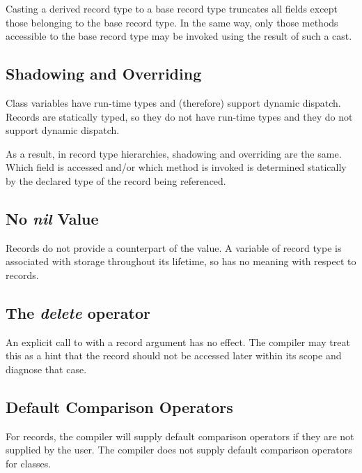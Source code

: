 Casting a derived record type to a base record type truncates all 
fields except those belonging to the base record type.  In the same way, only
those methods accessible to the base record type may be invoked using the result
of such a cast.

\subsection{Shadowing and Overriding}
\label{Base_Method_Differences}

Class variables have run-time types and (therefore) support dynamic dispatch.
Records are statically typed, so they do not have run-time types and they do not
support dynamic dispatch.

As a result, in record type hierarchies, shadowing and overriding are the same.  
Which field is accessed
and/or which method is invoked is determined statically by the declared type of
the record being referenced.

\subsection{No {\em nil} Value}

Records do not provide a counterpart of the  value.  A variable of
record type is associated with storage throughout its lifetime, so 
has no meaning with respect to records.

\subsection{The {\em delete} operator}

An explicit call to  with a record argument has no effect.  The
compiler may treat this as a hint that the record should not be accessed later
within its scope and diagnose that case.

\subsection{Default Comparison Operators}
\label{Comparison_Operator_Differences}

For records, the compiler will supply default comparison operators if they are
not supplied by the user.  The compiler does not supply default comparison
operators for classes.


